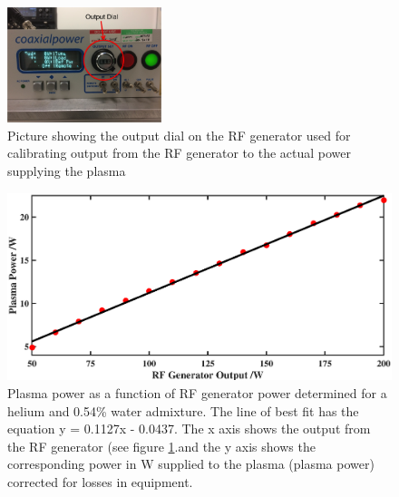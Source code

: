 \documentclass[11pt, oneside]{article}   	%
\begin{document}
\begin{figure}
    \centering
    \includegraphics[width=0.4\textwidth]{Figures/OutputDial.png}
    \caption{Picture showing the output dial on the RF generator used for calibrating output from the RF generator to the actual power supplying the plasma}
    \label{fig:OutputDial}
\end{figure}

\begin{figure}
    \centering
    \includegraphics[width=\textwidth]{Figures/ActualPowerBig.eps}
    \caption{Plasma power as a function of RF generator power determined for a helium and 0.54\% water admixture. The line of best fit has the equation y = 0.1127x - 0.0437. The x axis shows the output from the RF generator (see figure \ref{fig:OutputDial}.and the y axis shows the corresponding power in W supplied to the plasma (plasma power) corrected for losses in equipment.}
    \label{fig:SolaylPower}
\end{figure}

\end{document}

